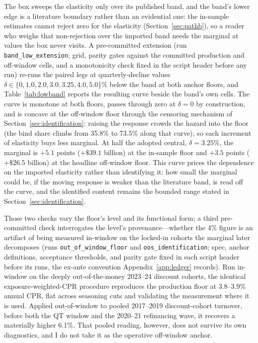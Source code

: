 \documentclass[12pt]{article}
\begin{document}
The box sweeps the elasticity only over its published band, and the band's lower edge is a literature boundary rather than an evidential one: the in-sample estimates cannot reject zero for the elasticity (Section~\ref{sec:pathb}), so a reader who weighs that non-rejection over the imported band needs the marginal at values the box never visits. A pre-committed extension (run \texttt{band\_low\_extension}; grid, parity gates against the committed production and off-window cells, and a monotonicity check fixed in the script header before any run) re-runs the paired legs at quarterly-decline values $\delta \in \{0, 1.0, 2.0, 3.0, 3.25, 4.0, 5.0\}\%$ below the band at both anchor floors, and Table~\ref{tab:lowband} reports the resulting curve beside the band's own cells. The curve is monotone at both floors, passes through zero at $\delta = 0$ by construction, and is concave at the off-window floor through the censoring mechanism of Section~\ref{sec:identification}: raising the response crowds the hazard into the floor (the bind share climbs from 35.8\% to 73.5\% along that curve), so each increment of elasticity buys less marginal. At half the adopted central, $\delta = 3.25\%$, the marginal is $+5.1$ points ($+\$39.1$ billion) at the in-sample floor and $+3.5$ points ($+\$26.5$ billion) at the headline off-window floor. This curve prices the dependence on the imported elasticity rather than identifying it: how small the marginal could be, if the moving response is weaker than the literature band, is read off the curve, and the identified content remains the bounded range stated in Section~\ref{sec:identification}.


Those two checks vary the floor's level and its functional form; a third pre-committed check interrogates the level's provenance---whether the 4\% figure is an artifact of being measured in-window on the locked-in cohorts the marginal later decomposes (runs \texttt{out\_of\_window\_floor} and \texttt{oos\_identification}; spec, anchor definitions, acceptance thresholds, and parity gate fixed in each script header before its runs, the ex-ante convention Appendix~\ref{app:ledger} records). Run in-window on the deeply out-of-the-money 2023--24 discount cohorts, the identical exposure-weighted-CPR procedure reproduces the production floor at 3.8--3.9\% annual CPR, flat across seasoning cuts and validating the measurement where it is used. Applied out-of-window to pooled 2017--2019 discount-cohort turnover, before both the QT window and the 2020--21 refinancing wave, it recovers a materially higher 6.1\%. That pooled reading, however, does not survive its own diagnostics, and I do not take it as the operative off-window anchor.
\end{document}
